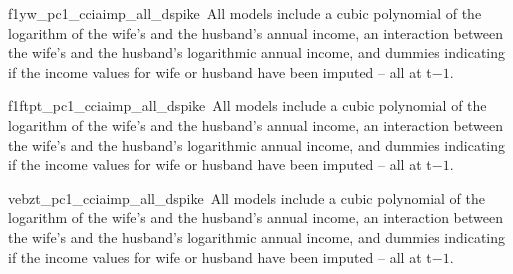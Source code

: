 \documentclass[a4paper,11pt]{scrartcl}
\begin{document}
\renewcommand{\samplenote}{}

\renewcommand{\specnote}{}

\newcommand{\xtfenoteB}{All models include dummies for age groups of 5 years for both spouses, dummy variables for the age of the youngest child in the household, the district level unemployment rate at the month of the interview, and dummy variables for the survey year -- all at t. Averaged over 25 simulation runs based on procedures described in the data section. Standard errors clustered on couple level in parentheses; *** p$<$0.001, ** p$<$0.01, * p$<$0.05, \dag\, p$<$0.1}

\renewcommand{\specnote}{All models include a cubic polynomial of the logarithm of the wife's and the husband's annual income, an interaction between the wife's and the husband's logarithmic annual income, and dummies indicating if the income values for wife or husband have been imputed -- all at t$-1$.}


%
{f1yw_pc1_cciaimp_all_dspike}%
{\samplenote\,\specnote}

%
{f1ftpt_pc1_cciaimp_all_dspike}%
{\samplenote\,\specnote}

%
{vebzt_pc1_cciaimp_all_dspike}%
{\samplenote\,\specnote}

%
%

\pagestyle{plain}


\clearpage
\end{document}
